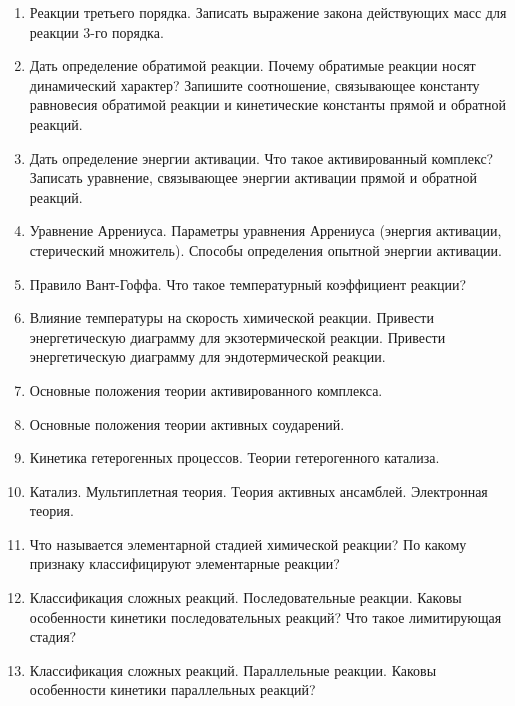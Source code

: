\begin{enumerate}
\item
Реакции третьего порядка. Записать выражение закона действующих масс для реакции 3-го порядка.
 
\item
Дать определение обратимой реакции. Почему обратимые реакции носят динамический характер? Запишите соотношение, связывающее константу равновесия обратимой реакции и кинетические константы прямой и обратной реакций.
 
\item
Дать определение энергии активации. Что такое активированный комплекс? Записать уравнение, связывающее энергии активации  прямой и обратной реакций.
 
\item 
Уравнение Аррениуса. Параметры уравнения Аррениуса (энергия активации, стерический множитель). Способы определения опытной энергии активации.
 
\item
Правило Вант-Гоффа. Что такое температурный коэффициент реакции? 
 
\item 
Влияние температуры на скорость химической реакции. Привести энергетическую диаграмму для экзотермической реакции.
Привести энергетическую диаграмму для эндотермической реакции.
 
\item
Основные положения теории активированного комплекса.
 
\item
Основные положения теории активных соударений.
 
\item
Кинетика гетерогенных процессов. Теории гетерогенного катализа.
 
\item
Катализ. Мультиплетная теория. Теория активных ансамблей. Электронная теория.
 
%
\item
Что называется элементарной стадией химической реакции? По какому признаку классифицируют элементарные реакции?
 
\item
Классификация сложных реакций. Последовательные реакции. Каковы особенности кинетики последовательных реакций? Что такое лимитирующая стадия?
 
\item
Классификация сложных реакций. Параллельные реакции. Каковы особенности кинетики параллельных реакций? 
 

\end{enumerate}
